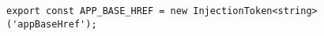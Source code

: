\begin{verbatim}
export const APP_BASE_HREF = new InjectionToken<string>('appBaseHref');
\end{verbatim}
